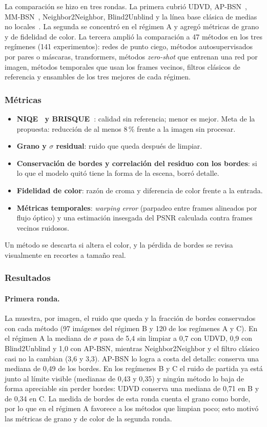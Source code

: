 La comparación se hizo en tres rondas. La primera cubrió UDVD, AP-BSN~\cite{lee2022apbsn}, MM-BSN~\cite{zhang2023mmbsn}, Neighbor2Neighbor, Blind2Unblind y la línea base clásica de medias no locales~\cite{buades2005nlm}. La segunda se concentró en el régimen A y agregó métricas de grano y de fidelidad de color. La tercera amplió la comparación a 47 métodos en los tres regímenes (141 experimentos): redes de punto ciego, métodos autosupervisados por pares o máscaras, transformers, métodos \textit{zero-shot} que entrenan una red por imagen, métodos temporales que usan los frames vecinos, filtros clásicos de referencia y ensambles de los tres mejores de cada régimen.

\subsubsection{Métricas}
\begin{itemize}
    \item \textbf{NIQE~\cite{mittal2013making} y BRISQUE~\cite{mittal2012noreference}}: calidad sin referencia; menor es mejor. Meta de la propuesta: reducción de al menos 8\,\% frente a la imagen sin procesar.
    \item \textbf{Grano y $\sigma$ residual}: ruido que queda después de limpiar.
    \item \textbf{Conservación de bordes y correlación del residuo con los bordes}: si lo que el modelo quitó tiene la forma de la escena, borró detalle.
    \item \textbf{Fidelidad de color}: razón de croma y diferencia de color frente a la entrada.
    \item \textbf{Métricas temporales}: \textit{warping error} (parpadeo entre frames alineados por flujo óptico) y una estimación insesgada del PSNR calculada contra frames vecinos ruidosos.
\end{itemize}
Un método se descarta si altera el color, y la pérdida de bordes se revisa visualmente en recortes a tamaño real.

\subsubsection{Resultados}
\paragraph{Primera ronda.} La  muestra, por imagen, el ruido que queda y la fracción de bordes conservados con cada método (97 imágenes del régimen B y 120 de los regímenes A y C). En el régimen A la mediana de $\sigma$ pasa de 5,4 sin limpiar a 0,7 con UDVD, 0,9 con Blind2Unblind y 1,0 con AP-BSN, mientras Neighbor2Neighbor y el filtro clásico casi no la cambian (3,6 y 3,3). AP-BSN lo logra a costa del detalle: conserva una mediana de 0,49 de los bordes. En los regímenes B y C el ruido de partida ya está junto al límite visible (medianas de 0,43 y 0,35) y ningún método lo baja de forma apreciable sin perder bordes: UDVD conserva una mediana de 0,71 en B y de 0,34 en C. La medida de bordes de esta ronda cuenta el grano como borde, por lo que en el régimen A favorece a los métodos que limpian poco; esto motivó las métricas de grano y de color de la segunda ronda.

